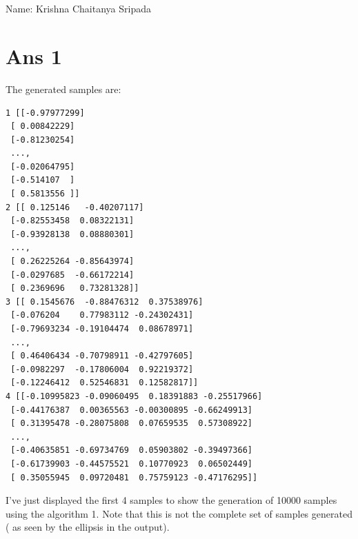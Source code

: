 \documentclass[10pt]{article}
\begin{document}
\section*{}
\begin{flushleft}
Name: Krishna Chaitanya Sripada\\
\end{flushleft}
\section*{Ans 1}
\begin{flushleft}
The generated samples are:\\
\begin{lstlisting}
1 [[-0.97977299]
 [ 0.00842229]
 [-0.81230254]
 ..., 
 [-0.02064795]
 [-0.514107  ]
 [ 0.5813556 ]]
2 [[ 0.125146   -0.40207117]
 [-0.82553458  0.08322131]
 [-0.93928138  0.08880301]
 ..., 
 [ 0.26225264 -0.85643974]
 [-0.0297685  -0.66172214]
 [ 0.2369696   0.73281328]]
3 [[ 0.1545676  -0.88476312  0.37538976]
 [-0.076204    0.77983112 -0.24302431]
 [-0.79693234 -0.19104474  0.08678971]
 ..., 
 [ 0.46406434 -0.70798911 -0.42797605]
 [-0.0982297  -0.17806004  0.92219372]
 [-0.12246412  0.52546831  0.12582817]]
4 [[-0.10995823 -0.09060495  0.18391883 -0.25517966]
 [-0.44176387  0.00365563 -0.00300895 -0.66249913]
 [ 0.31395478 -0.28075808  0.07659535  0.57308922]
 ..., 
 [-0.40635851 -0.69734769  0.05903802 -0.39497366]
 [-0.61739903 -0.44575521  0.10770923  0.06502449]
 [ 0.35055945  0.09720481  0.75759123 -0.47176295]]
 \end{lstlisting}
I've just displayed the first 4 samples to show the generation of 10000 samples using the algorithm 1. Note that this is not the complete set of samples generated ( as seen by the ellipsis in the output).
\end{flushleft}
\end{document}
